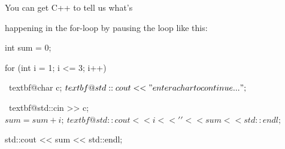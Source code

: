 You can get C++ to tell us what's

happening in the for-loop by pausing the loop like this:

\begin{console}[commandchars=\~\@\$]

int sum = 0;

for (int i = 1; i <= 3; i++)

{   

     ~textbf@char c;$

     ~textbf@std::cout << "enter a char to continue ...";$

     ~textbf@std::cin >> c;$



     sum = sum + i;

     ~textbf@std::cout << i << ' ' << sum << std::endl;$

}

std::cout << sum << std::endl;

\end{console}

